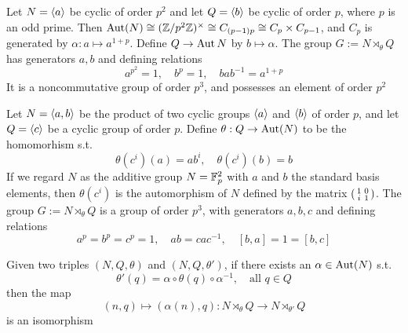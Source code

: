 \documentclass[11pt]{article}
\begin{document}
\begin{examplle}
Let \(N=\langle a\rangle\) be cyclic of order \(p^2\) and let \(Q=\langle b\rangle\) be cyclic of order \(p\),
where \(p\) is an odd prime. Then \(\operatorname{\text{Aut}}(N)\cong(\mathbb{Z}/p^2\mathbb{Z})^\times\cong C_{(p-1)p}\cong C_p\times C_{p-1}\), and \(C_p\)
is generated by \(\alpha:a\mapsto a^{1+p}\). Define \(Q\to\operatorname{\text{Aut}} N\) by \(b\mapsto\alpha\). The
group \(G:=N\rtimes_\theta Q\) has generators \(a,b\) and defining relations
\begin{equation*}
a^{p^2}=1,\quad b^p=1,\quad bab^{-1}=a^{1+p}
\end{equation*}
It is a noncommutative group of order \(p^3\), and possesses an element of order \(p^2\)
\end{examplle}

\begin{examplle}
Let \(N=\langle a,b\rangle\) be the product of two cyclic groups \(\langle a\rangle\) and \(\langle b\rangle\) of order \(p\), and
let \(Q=\langle c\rangle\) be a cyclic group of order \(p\). Define \(\theta:Q\to\operatorname{\text{Aut}}(N)\) to be the homomorhism
s.t.
\begin{equation*}
\theta(c^i)(a)=ab^i,\quad \theta(c^i)(b)=b
\end{equation*}
If we regard \(N\) as the additive group \(N=\mathbb{F}_p^2\) with \(a\) and \(b\) the standard basis
elements, then \(\theta(c^i)\) is the automorphism of \(N\) defined by the
matrix \(\begin{psmallmatrix}1&0\\i&1\end{psmallmatrix}\). The group \(G:=N\rtimes_\theta Q\) is a
group of order \(p^3\), with generators \(a,b,c\) and defining relations
\begin{equation*}
a^p=b^p=c^p=1,\quad ab=cac^{-1},\quad [b,a]=1=[b,c]
\end{equation*}
\end{examplle}

\begin{lemma}[]
Given two triples \((N,Q,\theta)\) and \((N,Q,\theta')\),  if there exists an \(\alpha\in\operatorname{\text{Aut}}(N)\) s.t.
\begin{equation*}
\theta'(q)=\alpha\circ\theta(q)\circ\alpha^{-1},\quad\text{all }q\in Q
\end{equation*}
then the map
\begin{equation*}
(n,q)\mapsto(\alpha(n),q):N\rtimes_\theta Q\to N\rtimes_{\theta'}Q
\end{equation*}
is an isomorphism
\end{lemma}
\end{document}
